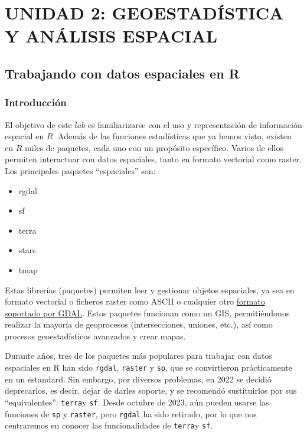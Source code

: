 \documentclass[
  letterpaper,
  DIV=11,
  numbers=noendperiod]{scrreprt}
\providecommand{\tightlist}{%
  \setlength{\itemsep}{0pt}\setlength{\parskip}{0pt}}\usepackage{longtable,booktabs,array}
\begin{document}
\part{UNIDAD 2: GEOESTADÍSTICA Y ANÁLISIS ESPACIAL}

\hypertarget{sec-SpatialData}{%
\chapter{Trabajando con datos espaciales en R}\label{sec-SpatialData}}

\hypertarget{introducciuxf3n}{%
\section{Introducción}\label{introducciuxf3n}}

El objetivo de este \(lab\) es familiarizarse con el uso y
representación de información espacial en \(R\). Además de las funciones
estadísticas que ya hemos visto, existen en \(R\) miles de paquetes,
cada uno con un propósito específico. Varios de ellos permiten
interactuar con datos espaciales, tanto en formato vectorial como
raster. Los principales paquetes ``espaciales'' son:

\begin{itemize}
\tightlist
\item
  rgdal
\item
  sf
\item
  terra
\item
  stars
\item
  tmap
\end{itemize}

Estas librerías (paquetes) permiten leer y gestionar objetos espaciales,
ya sea en formato vectorial o ficheros raster como ASCII o cualquier
otro \href{http://www.gdal.org/formats_list.html}{formato soportado por
GDAL}. Estos paquetes funcionan como un GIS, permitiéndonos realizar la
mayoría de geoprocesos (intersecciones, uniones, etc.), así como
procesos geoestadísticos avanzados y crear mapas.

Durante años, tres de los paquetes más populares para trabajar con datos
espaciales en R han sido \texttt{rgdal}, \texttt{raster} y \texttt{sp},
que se convirtieron prácticamente en un estandard. Sin embargo, por
diversos problemas, en 2022 se decidió deprecarlos, es decir, dejar de
darles soporte, y se recomendó sustituirlos por sus ``equivalentes'':
\texttt{terra}y \texttt{sf}. Desde octubre de 2023, aún pueden usarse
las funciones de \texttt{sp} y \texttt{raster}, pero \texttt{rgdal} ha
sido retirado, por lo que nos centraremos en conocer las funcionalidades
de \texttt{terra}y \texttt{sf}.
\end{document}
